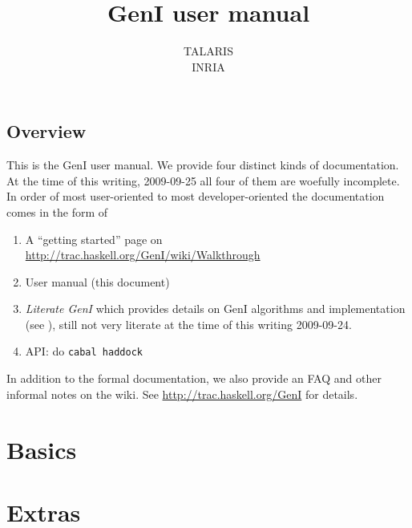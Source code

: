 \documentclass[a4paper,11pt]{report}
\begin{document}
\title{GenI user manual}
\author{TALARIS\\INRIA}

\maketitle
\tableofcontents


\chapter{Overview}

This is the GenI user manual.  We provide four distinct kinds of
documentation.  At the time of this writing, 2009-09-25 all four of them
are woefully incomplete.  In order of most user-oriented to most
developer-oriented the documentation comes in the form of

\begin{enumerate}
\item A ``getting started'' page on\\
      \url{http://trac.haskell.org/GenI/wiki/Walkthrough}
\item User manual (this document)
\item \textit{Literate GenI} which provides details on GenI
      algorithms and implementation (see \cite{literateGeni}),
      still not very literate at the time of this writing
      2009-09-24.
\item API: do \verb!cabal haddock!
\end{enumerate}

In addition to the formal documentation, we also provide an FAQ and
other informal notes on the wiki.  See
\url{http://trac.haskell.org/GenI} for details.

\part{Basics}






\part{Extras}




{


}
\end{document}
